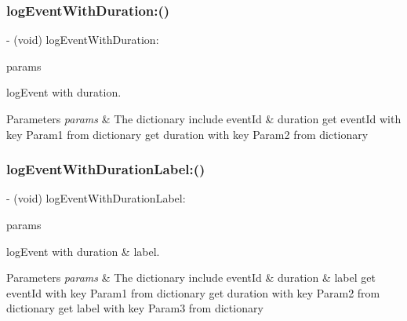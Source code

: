 \subsubsection{\texorpdfstring{log\+Event\+With\+Duration\+:()}{logEventWithDuration:()}}
{\footnotesize\ttfamily -\/ (void) log\+Event\+With\+Duration\+: \begin{DoxyParamCaption}\item[{(N\+S\+Mutable\+Dictionary$\ast$)}]{params }\end{DoxyParamCaption}}



log\+Event with duration. 


\begin{DoxyParams}{Parameters}
{\em params} & The dictionary include event\+Id \& duration get event\+Id with key \textquotesingle{}Param1\textquotesingle{} from dictionary get duration with key \textquotesingle{}Param2\textquotesingle{} from dictionary \\
\hline
\end{DoxyParams}
\mbox{\label{interfaceAnalyticsUmeng_a93bba736f6e9d2a69101ed2f04371cc6}} 
\subsubsection{\texorpdfstring{log\+Event\+With\+Duration\+Label\+:()}{logEventWithDurationLabel:()}}
{\footnotesize\ttfamily -\/ (void) log\+Event\+With\+Duration\+Label\+: \begin{DoxyParamCaption}\item[{(N\+S\+Mutable\+Dictionary$\ast$)}]{params }\end{DoxyParamCaption}}



log\+Event with duration \& label. 


\begin{DoxyParams}{Parameters}
{\em params} & The dictionary include event\+Id \& duration \& label get event\+Id with key \textquotesingle{}Param1\textquotesingle{} from dictionary get duration with key \textquotesingle{}Param2\textquotesingle{} from dictionary get label with key \textquotesingle{}Param3\textquotesingle{} from dictionary \\
\hline
\end{DoxyParams}
\mbox{\label{interfaceAnalyticsUmeng_ac3014fae8294c7ae2efdffecd13abdd3}} 
